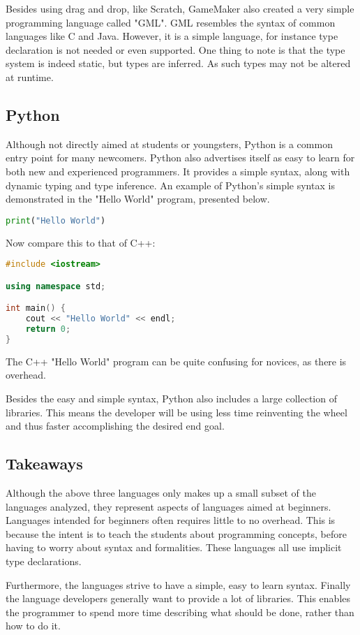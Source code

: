 Besides using drag and drop, like Scratch, GameMaker also created a very simple programming language called "GML".
GML resembles the syntax of common languages like C and Java. 
However, it is a simple language, for instance type declaration is not needed or even supported.
One thing to note is that the type system is indeed static, but types are inferred. 
As such types may not be altered at runtime\cite{GML}.

\subsection{Python}
Although not directly aimed at students or youngsters, Python is a common entry point for many newcomers. 
Python also advertises itself as easy to learn for both new and experienced programmers. 
It provides a simple syntax, along with dynamic typing and type inference\cite{PythonWebsite}.
An example of Python's simple syntax is demonstrated in the "Hello World" program, presented below.

\begin{lstlisting}[language=Python,label=lis:PythonHelloWorld,caption=Hello World in python]
print("Hello World")
\end{lstlisting}

Now compare this to that of C++:

\begin{lstlisting}[language=C++,label=lis:C++HelloWorld,caption=Hello World in C++]
#include <iostream>

using namespace std;

int main() {
	cout << "Hello World" << endl;
	return 0;
}
\end{lstlisting}

The C++ "Hello World" program can be quite confusing for novices, as there is overhead.

Besides the easy and simple syntax, Python also includes a large collection of libraries\cite{PythonLibraries}.
This means the developer will be using less time reinventing the wheel and thus faster accomplishing the desired end goal\cite{PythonXKCD}.

\subsection{Takeaways}
Although the above three languages only makes up a small subset of the languages analyzed, they represent aspects of languages aimed at beginners.
Languages intended for beginners often requires little to no overhead. 
This is because the intent is to teach the students about programming concepts, before having to worry about syntax and formalities. 
These languages all use implicit type declarations.

Furthermore, the languages strive to have a simple, easy to learn syntax. 
Finally the language developers generally want to provide a lot of libraries. 
This enables the programmer to spend more time describing what should be done, rather than how to do it.
